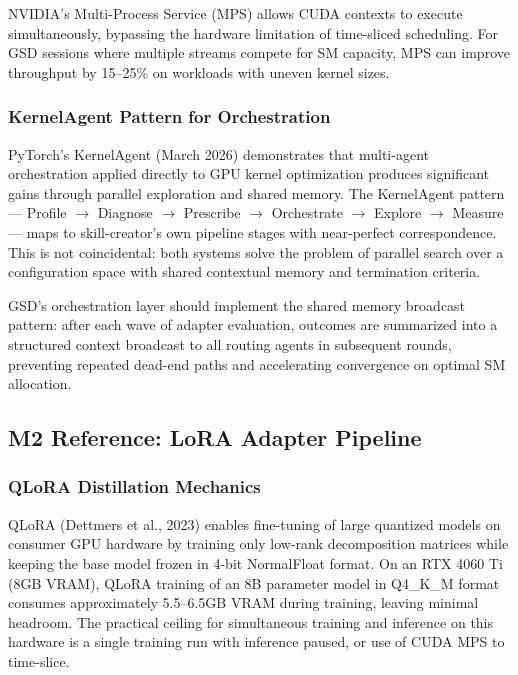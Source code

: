 \documentclass[11pt,letterpaper]{article}
\begin{document}
NVIDIA's Multi-Process Service (MPS) allows CUDA contexts to execute simultaneously, bypassing the hardware limitation of time-sliced scheduling. For GSD sessions where multiple streams compete for SM capacity, MPS can improve throughput by 15--25\% on workloads with uneven kernel sizes.

\subsubsection{KernelAgent Pattern for Orchestration}

PyTorch's KernelAgent (March 2026) demonstrates that multi-agent orchestration applied directly to GPU kernel optimization produces significant gains through parallel exploration and shared memory. The KernelAgent pattern --- Profile $\rightarrow$ Diagnose $\rightarrow$ Prescribe $\rightarrow$ Orchestrate $\rightarrow$ Explore $\rightarrow$ Measure --- maps to skill-creator's own pipeline stages with near-perfect correspondence. This is not coincidental: both systems solve the problem of parallel search over a configuration space with shared contextual memory and termination criteria.

GSD's orchestration layer should implement the shared memory broadcast pattern: after each wave of adapter evaluation, outcomes are summarized into a structured context broadcast to all routing agents in subsequent rounds, preventing repeated dead-end paths and accelerating convergence on optimal SM allocation.

\subsection{M2 Reference: LoRA Adapter Pipeline}

\subsubsection{QLoRA Distillation Mechanics}

QLoRA (Dettmers et al., 2023) enables fine-tuning of large quantized models on consumer GPU hardware by training only low-rank decomposition matrices while keeping the base model frozen in 4-bit NormalFloat format. On an RTX 4060 Ti (8GB VRAM), QLoRA training of an 8B parameter model in Q4\_K\_M format consumes approximately 5.5--6.5GB VRAM during training, leaving minimal headroom. The practical ceiling for simultaneous training and inference on this hardware is a single training run with inference paused, or use of CUDA MPS to time-slice.
\end{document}

